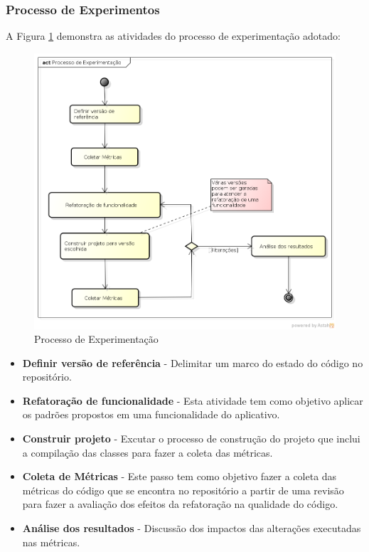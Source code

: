 \documentclass[conference]{IEEEtran}
\begin{document}
\subsubsection{Processo de Experimentos}


A Figura \ref{processo_experimentacao} demonstra as atividades do processo de
experimentação adotado:
\begin{figure}[!htb]
	\begin{center}
	\includegraphics[scale=0.25]{img/processo_experimentacao.png}
	\end{center}
	
	\caption{\label{processo_experimentacao} Processo de Experimentação}
\end{figure}


\begin{itemize}
\item \textbf{Definir versão de referência} - Delimitar um marco do estado do
código no repositório.
\item \textbf{Refatoração de funcionalidade} - Esta atividade tem como
objetivo aplicar os padrões propostos em uma funcionalidade do aplicativo.
\item \textbf{Construir projeto} - Excutar o processo de construção do
projeto que inclui a compilação das classes para fazer a coleta das métricas.
\item \textbf{Coleta de Métricas} - Este passo tem como objetivo fazer a coleta
das métricas do código que se encontra no repositório a partir de uma revisão
para fazer a avaliação dos efeitos da refatoração na qualidade do código.
\item \textbf{Análise dos resultados} - Discussão dos impactos das alterações
executadas nas métricas.
\end{itemize}
\end{document}
